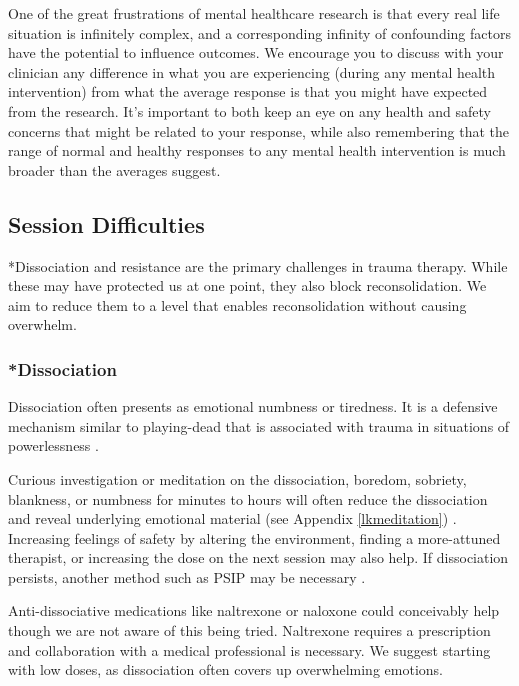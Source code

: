 \documentclass[12pt,letterpaper]{article}
\begin{document}
One of the great frustrations of mental healthcare research is that every real life situation is infinitely complex, and a corresponding infinity of confounding factors have the potential to influence outcomes. We encourage you to discuss with your clinician any difference in what you are experiencing (during any mental health intervention) from what the average response is that you might have expected from the research. It's important to both keep an eye on any health and safety concerns that might be related to your response, while also remembering that the range of normal and healthy responses to any mental health intervention is much broader than the averages suggest.
\subsection{Session Difficulties}
\label{sec:dissociationandresistance}
*Dissociation and resistance are the primary challenges in trauma therapy. While these may have protected us at one point, they also block reconsolidation. We aim to reduce them to a level that enables reconsolidation without causing overwhelm.

\subsubsection{*Dissociation}

Dissociation often presents as emotional numbness or tiredness. It is a defensive mechanism similar to playing-dead that is associated with trauma in situations of powerlessness \cite{loewensteinDissociation}.

Curious investigation or meditation on the dissociation, boredom, sobriety, blankness, or numbness for minutes to hours will often reduce the dissociation and reveal underlying emotional material (see Appendix \ref{lkmeditation}) \cite{razviPSIP}.  Increasing feelings of safety by altering the environment, finding a more-attuned therapist, or increasing the dose on the next session may also help. If dissociation persists, another method such as PSIP may be necessary \cite{razviPSIP}.

Anti-dissociative medications like naltrexone or naloxone could conceivably help though we are not aware of this being tried. Naltrexone requires a prescription and collaboration with a medical professional is necessary. We suggest starting with low doses, as dissociation often covers up overwhelming emotions. 
\end{document}
